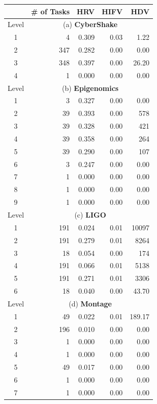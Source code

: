 \documentclass[final,5p,times,twocolumn]{elsarticle}
\begin{document}
\begin{table}[!htb]
	\setlength{\tabcolsep}{12pt}
	\centering
	\small
	\begin{tabular}{c|r|r|r|r}
		& \# of Tasks & HRV &  HIFV & HDV  \\ \hline
		Level & \multicolumn{4}{c}{(a) \textbf{CyberShake}} \\
		\hline
		1 & 4 & 0.309 & 0.03 & 1.22 \\
		2 & 347 & 0.282 & 0.00 & 0.00 \\
		3 & 348 & 0.397 & 0.00 & 26.20 \\
		4 & 1 & 0.000 & 0.00 & 0.00 \\
		\hline
		Level & \multicolumn{4}{c}{(b) \textbf{Epigenomics}} \\
		\hline
		1 & 3 & 0.327 & 0.00 & 0.00  \\
		2 & 39 & 0.393 & 0.00 & 578 \\
		3 & 39 & 0.328 & 0.00 & 421 \\
		4 & 39 & 0.358 & 0.00 & 264 \\
		5 &39 & 0.290 & 0.00 & 107 \\
		6 & 3 & 0.247 & 0.00 & 0.00  \\
		7 &1  & 0.000 & 0.00 & 0.00 \\
		8 &1 & 0.000 & 0.00 & 0.00 \\
		9 & 1 & 0.000 & 0.00 & 0.00 \\
		\hline
		Level & \multicolumn{4}{c}{(c) \textbf{LIGO}} \\
		\hline
		1 & 191 & 0.024 & 0.01 & 10097 \\
		2 & 191 & 0.279 & 0.01 & 8264 \\
		3 & 18 & 0.054 & 0.00 & 174 \\
		4 & 191 & 0.066 & 0.01 & 5138 \\
		5 & 191 & 0.271 & 0.01 & 3306 \\
		6 & 18 &  0.040 & 0.00 & 43.70 \\
		\hline		
		Level & \multicolumn{4}{c}{(d) \textbf{Montage}} \\
		\hline
		1 &49 & 0.022 & 0.01 & 189.17 \\
		2 & 196 & 0.010 & 0.00 & 0.00 \\
		3 & 1 & 0.000 & 0.00 & 0.00 \\
		4 & 1 & 0.000 & 0.00 & 0.00 \\
		5 &49 & 0.017 & 0.00 & 0.00 \\
		6 & 1 & 0.000 & 0.00 & 0.00 \\
		7 &1  & 0.000 & 0.00 & 0.00 \\

\end{tabular}
\end{table}
\end{document}
